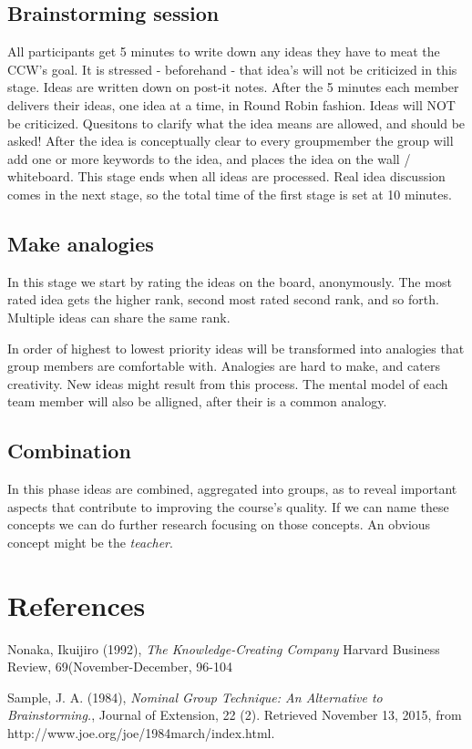 \section{Brainstorming session}
All participants get 5 minutes to write down any ideas they have to meat the CCW's goal. It is stressed - beforehand - that idea's will not be criticized in this stage. Ideas are written down on post-it notes. After the 5 minutes each member delivers their ideas, one idea at a time, in Round Robin fashion. Ideas will NOT be criticized. Quesitons to clarify what the idea means are allowed, and should be asked! After the idea is conceptually clear to every groupmember the group will add one or more keywords to the idea, and places the idea on the wall / whiteboard. This stage ends when all ideas are processed. Real idea discussion comes in the next stage, so the total time of the first stage is set at 10 minutes.

\section{Make analogies}
In this stage we start by rating the ideas on the board, anonymously. The most rated idea gets the higher rank, second most rated second rank, and so forth. Multiple ideas can share the same rank. 

In order of highest to lowest priority ideas will be transformed into analogies that group members are comfortable with. Analogies are hard to make, and caters creativity. New ideas might result from this process. The mental model of each team member will also be alligned, after their is a common analogy.    

\section{Combination}
In this phase ideas are combined, aggregated into groups, as to reveal important aspects that contribute to improving the course's quality. If we can name these concepts we can do further research focusing on those concepts. An obvious concept might be the \textit{teacher}. 

\chapter{References}

\begin{thebibliography}{9}
	
	Nonaka, Ikuijiro (1992),
	\textit{The Knowledge-Creating Company}
	Harvard Business Review, 69(November-December, 96-104
	
	Sample, J. A. (1984),
	\textit{Nominal Group Technique: An Alternative to Brainstorming.},
	Journal of Extension, 22 (2). Retrieved November 13,
	2015, from http://www.joe.org/joe/1984march/index.html.
	
	
	
\end{thebibliography}


\appendix



